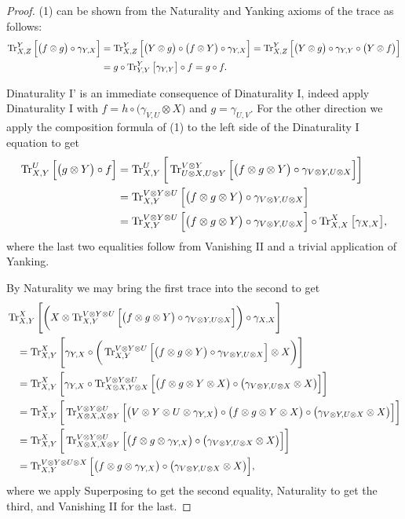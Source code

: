 \begin{proof}
 (1) can be shown from the Naturality and Yanking axioms of the trace as follows:
 \begin{align*}
  \operatorname{Tr}^Y_{X,Z}\Big[\big(f\otimes g\big)\circ\gamma_{Y,X}\Big]
  &=\operatorname{Tr}^Y_{X,Z}\Big[\big(Y\otimes g\big)\circ\big(f\otimes Y\big)\circ\gamma_{Y,X}\Big]=\operatorname{Tr}^Y_{X,Z}\Big[\big(Y\otimes g\big)\circ\gamma_{Y,Y}\circ\big(Y\otimes f\big)\Big]\\
  &=g\circ\operatorname{Tr}^Y_{Y,Y}\big[\gamma_{Y,Y}\big]\circ f=g\circ f.
 \end{align*}
 
 Dinaturality I' is an immediate consequence of Dinaturality I, indeed apply Dinaturality I with $f=h\circ\big(\gamma_{V,U}\otimes X\big)$ and $g=\gamma_{U,V}$.  For the other direction we apply the composition formula of (1) to the left side of the Dinaturality I equation to get
 \begin{align*}
  \operatorname{Tr}^U_{X,Y}\Big[\big(g\otimes Y\big)\circ f\Big]
  &=\operatorname{Tr}^U_{X,Y}\bigg[\operatorname{Tr}^{V\otimes Y}_{U\otimes X,U\otimes Y}\Big[\big(f\otimes g\otimes Y\big)\circ\gamma_{V\otimes Y,U\otimes X}\Big]\bigg]\\
 &=\operatorname{Tr}^{V\otimes Y\otimes U}_{X,Y}\Big[\big(f\otimes g\otimes Y\big)\circ\gamma_{V\otimes Y,U\otimes X}\Big]\\
  &=\operatorname{Tr}^{V\otimes Y\otimes U}_{X,Y}\Big[\big(f\otimes g\otimes Y\big)\circ\gamma_{V\otimes Y,U\otimes X}\Big]\circ\operatorname{Tr}^X_{X,X}\big[\gamma_{X,X}\big],
 \end{align*}
 where the last two equalities follow from Vanishing II and a trivial application of Yanking.  
 
 By Naturality we may bring the first trace into the second to get
 \begin{align*}
  &\operatorname{Tr}^X_{X,Y}\Bigg[\bigg(X\otimes \operatorname{Tr}^{V\otimes Y\otimes U}_{X,Y}\Big[\big(f\otimes g\otimes Y\big)\circ\gamma_{V\otimes Y,U\otimes X}\Big]\bigg)\circ\gamma_{X,X}\Bigg]\\
  &\quad=\operatorname{Tr}^X_{X,Y}\Bigg[\gamma_{Y,X}\circ\bigg(\operatorname{Tr}^{V\otimes Y\otimes U}_{X,Y}\Big[\big(f\otimes g\otimes Y\big)\circ\gamma_{V\otimes Y,U\otimes X}\Big]\otimes X\bigg)\Bigg]\\
  &\quad=\operatorname{Tr}^X_{X,Y}\bigg[\gamma_{Y,X}\circ\operatorname{Tr}^{V\otimes Y\otimes U}_{X\otimes X,Y\otimes X}\Big[\big(f\otimes g\otimes Y\otimes X\big)\circ\big(\gamma_{V\otimes Y,U\otimes X}\otimes X\big)\Big]\bigg]\\
  &\quad=\operatorname{Tr}^X_{X,Y}\bigg[\operatorname{Tr}^{V\otimes Y\otimes U}_{X\otimes X,X\otimes Y}\Big[\big(V\otimes Y\otimes U\otimes \gamma_{Y,X}\big)\circ\big(f\otimes g\otimes Y\otimes X\big)\circ\big(\gamma_{V\otimes Y,U\otimes X}\otimes X\big)\Big]\bigg]\\
  &\quad=\operatorname{Tr}^X_{X,Y}\bigg[\operatorname{Tr}^{V\otimes Y\otimes U}_{X\otimes X,X\otimes Y}\Big[\big(f\otimes g\otimes \gamma_{Y,X}\big)\circ\big(\gamma_{V\otimes Y,U\otimes X}\otimes X\big)\Big]\bigg]\\
  &\quad=\operatorname{Tr}^{V\otimes Y\otimes U\otimes X}_{X,Y}\Big[\big(f\otimes g\otimes \gamma_{Y,X}\big)\circ\big(\gamma_{V\otimes Y,U\otimes X}\otimes X\big)\Big],
 \end{align*}
 where we apply Superposing to get the second equality, Naturality to get the third, and Vanishing II for the last.
 

\end{proof}

